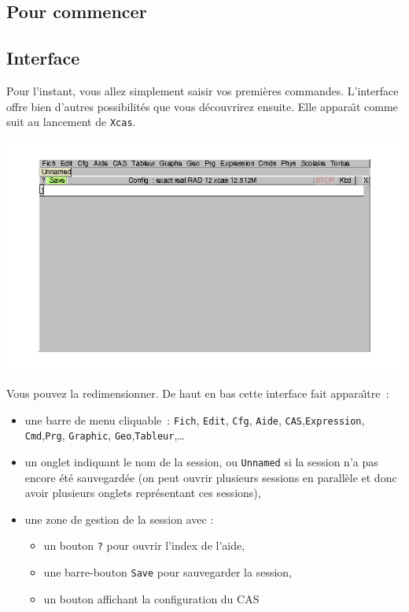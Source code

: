 \documentclass{article}
\begin{document}
\begin{giacjshere}
\printindex




\section{Pour commencer}

\subsection{Interface}
%
Pour l'instant, vous allez simplement saisir vos premi\`eres
commandes. L'interface offre bien d'autres possibilit\'es que vous
d\'ecouvrirez ensuite. Elle appara\^\i t comme suit au lancement de {\tt Xcas}.

\centerline{
\includegraphics[width=\textwidth]{demarr1}
}
Vous pouvez la redimensionner. De haut en bas  cette interface
fait appara\^\i tre~:
\begin{itemize}
\item
une barre de menu cliquable~: \verb|Fich|, \verb|Edit|,
\verb|Cfg|, \verb|Aide|, \verb|CAS|,\verb|Expression|,
\verb|Cmd|,\verb|Prg|,
 \verb|Graphic|, \verb|Geo|,\verb|Tableur|,\ldots
{}
\item
un onglet indiquant le nom de la session, ou {\tt Unnamed} si la session n'a 
pas encore \'et\'e sauvegard\'ee (on peut ouvrir plusieurs sessions en 
parall\`ele et donc avoir plusieurs onglets repr\'esentant ces sessions),
\item une zone de gestion de la session avec :
\begin{itemize}
\item un bouton \verb|?| pour ouvrir l'index de l'aide,
\item une barre-bouton \verb|Save| pour sauvegarder la session, 
\item un bouton affichant la configuration du CAS

\end{itemize}
\end{itemize}
\end{giacjshere}
\end{document}

